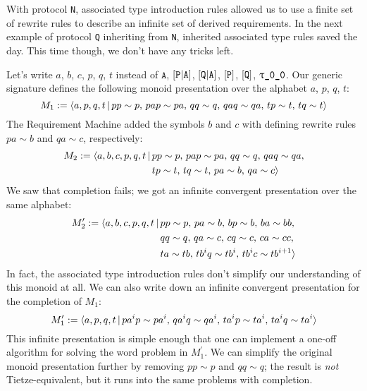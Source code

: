 \documentclass[../generics]{subfiles}
\begin{document}
\begin{example}
With protocol \texttt{N}, associated type introduction rules allowed us to use a finite set of rewrite rules to describe an infinite set of derived requirements. In the next example of protocol \texttt{Q} inheriting from \texttt{N}, inherited associated type rules saved the day. This time though, we don't have any tricks left.

\smallskip

Let's write $a$, $b$, $c$, $p$, $q$, $t$ instead of $\texttt{A}$, $[\texttt{P}|\texttt{A}]$, $[\texttt{Q}|\texttt{A}]$, $[\texttt{P}]$, $[\texttt{Q}]$, $\ttgp{0}{0}$. Our generic signature defines the following monoid presentation over the alphabet $a$, $p$, $q$, $t$:
\[M_1 := \langle a,p,q,t\,|\,pp\sim p,\,pap\sim pa,\,qq\sim q,\, qaq\sim qa,\, tp\sim t,\, tq\sim t\rangle\]
The Requirement Machine added the symbols $b$ and $c$ with defining rewrite rules $pa\sim b$ and $qa\sim c$, respectively:
\begin{align*}
M_2 := \langle a,b,c,p,q,t\,|\,\hbox{}&pp\sim p,\,pap\sim pa,\,qq\sim q,\, qaq\sim qa,\\
&tp\sim t,\, tq\sim t,\,pa\sim b,\,qa\sim c\rangle
\end{align*}
We saw that completion fails; we got an infinite convergent presentation over the same alphabet:
\begin{align*}
M_2^\prime := \langle a,b,c,p,q,t\,|\,\hbox{}&pp\sim p,\,pa\sim b,\,bp\sim b,\,ba\sim bb,\\
&qq\sim q,\,qa\sim c,\,cq\sim c,\,ca\sim cc,\\
&ta\sim tb,\, tb^iq\sim tb^i,\,tb^ic\sim tb^{i+1}\rangle
\end{align*}
In fact, the associated type introduction rules don't simplify our understanding of this monoid at all. We can also write down an infinite convergent presentation for the completion of $M_1$:
\[M_1^\prime := \langle a,p,q,t\,|\,pa^ip\sim pa^i,\, qa^iq\sim qa^i,\, ta^ip\sim ta^i,\, ta^iq\sim ta^i\rangle\]
This infinite presentation is simple enough that one can implement a one-off algorithm for solving the word problem in $M_1^\prime$. We can simplify the original monoid presentation further by removing $pp\sim p$ and $qq\sim q$; the result is \emph{not} Tietze-equivalent, but it runs into the same problems with completion.


\end{example}
\end{document}
